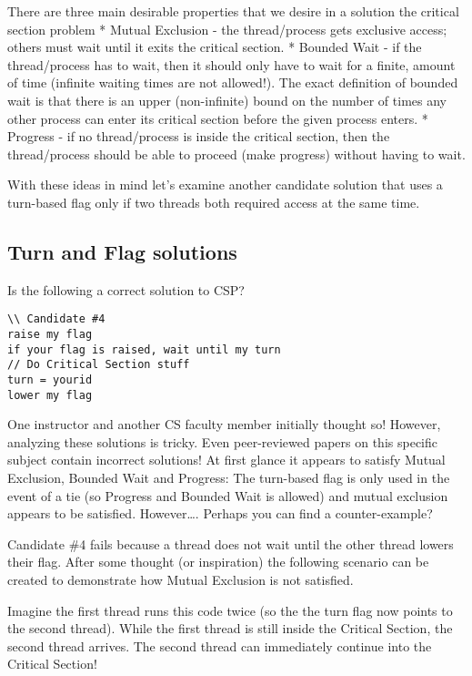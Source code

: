 There are three main desirable properties that we desire in a solution
the critical section problem * Mutual Exclusion - the thread/process
gets exclusive access; others must wait until it exits the critical
section. * Bounded Wait - if the thread/process has to wait, then it
should only have to wait for a finite, amount of time (infinite waiting
times are not allowed!). The exact definition of bounded wait is that
there is an upper (non-infinite) bound on the number of times any other
process can enter its critical section before the given process enters.
* Progress - if no thread/process is inside the critical section, then
the thread/process should be able to proceed (make progress) without
having to wait.

With these ideas in mind let's examine another candidate solution that
uses a turn-based flag only if two threads both required access at the
same time.

\subsection{Turn and Flag solutions}\label{turn-and-flag-solutions}

Is the following a correct solution to CSP?

\begin{verbatim}
\\ Candidate #4
raise my flag
if your flag is raised, wait until my turn
// Do Critical Section stuff
turn = yourid
lower my flag
\end{verbatim}

One instructor and another CS faculty member initially thought so!
However, analyzing these solutions is tricky. Even peer-reviewed papers
on this specific subject contain incorrect solutions! At first glance it
appears to satisfy Mutual Exclusion, Bounded Wait and Progress: The
turn-based flag is only used in the event of a tie (so Progress and
Bounded Wait is allowed) and mutual exclusion appears to be satisfied.
However\ldots{}. Perhaps you can find a counter-example?

Candidate \#4 fails because a thread does not wait until the other
thread lowers their flag. After some thought (or inspiration) the
following scenario can be created to demonstrate how Mutual Exclusion is
not satisfied.

Imagine the first thread runs this code twice (so the the turn flag now
points to the second thread). While the first thread is still inside the
Critical Section, the second thread arrives. The second thread can
immediately continue into the Critical Section!

